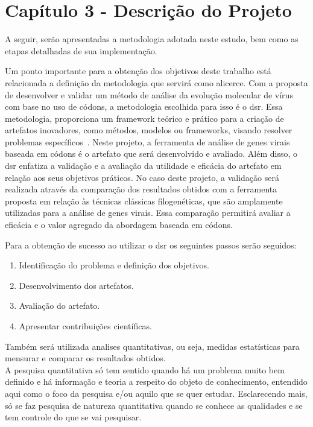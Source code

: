 
\chapter{Capítulo 3 - Descrição do Projeto}

A seguir, serão apresentadas a metodologia adotada neste estudo, bem como as etapas detalhadas de sua implementação.

Um ponto importante para a obtenção dos objetivos deste trabalho está relacionada a definição da metodologia que servirá como alicerce. Com a proposta de desenvolver e validar um método de análise da evolução molecular de vírus com base no uso de códons, a metodologia escolhida para isso é o \gls{dsr}. Essa metodologia, proporciona um framework teórico e prático para a criação de artefatos inovadores, como métodos, modelos ou frameworks, visando resolver problemas específicos~\cite{peffers_dsr_2007}. Neste projeto, a ferramenta de análise de genes virais baseada em códons é o artefato que será desenvolvido e avaliado. Além disso, o \gls{dsr} enfatiza a validação e a avaliação da utilidade e eficácia do artefato em relação aos seus objetivos práticos. No caso deste projeto, a validação será realizada através da comparação dos resultados obtidos com a ferramenta proposta em relação às técnicas clássicas filogenéticas, que são amplamente utilizadas para a análise de genes virais. Essa comparação permitirá avaliar a eficácia e o valor agregado da abordagem baseada em códons.

Para a obtenção de sucesso ao utilizar o \gls{dsr} os seguintes passos serão seguidos:
\begin{enumerate}
  \item Identificação do problema e definição dos objetivos.
  \item Desenvolvimento dos artefatos.
  \item Avaliação do artefato.
  \item Apresentar contribuições científicas.
\end{enumerate}

Também será utilizada analises quantitativas, ou seja, medidas estatísticas para mensurar e comparar os resultados obtidos.\\
A pesquisa quantitativa só tem sentido quando há um problema muito bem definido e há informação e teoria a respeito do objeto de conhecimento, entendido aqui como o foco da pesquisa e/ou aquilo que se quer estudar. Esclarecendo mais, só se faz pesquisa de natureza quantitativa quando se conhece as qualidades e se tem controle do que se vai pesquisar.\cite{da_silva_pesquisa_2014}

